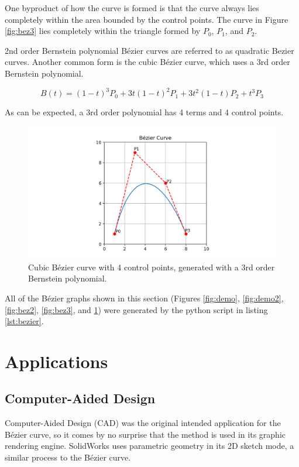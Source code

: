 \documentclass[12pt,letterpaper]{article}
\begin{document}
One byproduct of how the curve is formed is that the curve always lies completely within the area bounded by the control points. The curve in Figure \ref{fig:bez3} lies completely within the triangle formed by $P_0$, $P_1$, and $P_2$.

2nd order Bernstein polynomial B\'ezier curves are referred to as quadratic Bezier curves. Another common form is the cubic B\'ezier curve, which uses a 3rd order Bernstein polynomial.

$$B(t)=(1-t)^3 P_0+3t (1-t)^2 P_1+3t^2 (1-t) P_2+t^3 P_3$$

As can be expected, a 3rd order polynomial has 4 terms and 4 control points.

\begin{figure}[H]
    \centering
    \includegraphics[width=15cm]{Figure_5}
    \caption{Cubic B\'ezier curve with 4 control points, generated with a 3rd order Bernstein polynomial.}
    \label{fig:bez4}
\end{figure}

All of the B\'ezier graphs shown in this section (Figures \ref{fig:demo}, \ref{fig:demo2}, \ref{fig:bez2}, \ref{fig:bez3}, and \ref{fig:bez4}) were generated by the python script in listing \ref{lst:bezier}.

\section{Applications}

\subsection{Computer-Aided Design}

Computer-Aided Design (CAD) was the original intended application for the B\'ezier curve, so it comes by no surprise that the method is used in its graphic rendering engine. SolidWorks uses parametric geometry in its 2D sketch mode, a similar process to the B\'ezier curve. 
\end{document}
